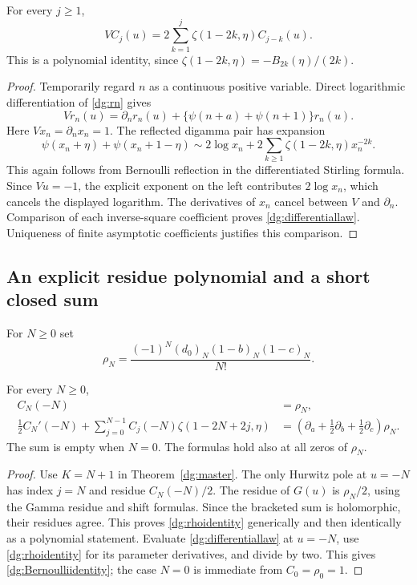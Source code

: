 \begin{lemma}\label{dg:differential}
For every $j\ge1$,
\begin{equation}\label{dg:differentiallaw}
 \boxed{VC_j(u)=2\sum_{k=1}^j
                      \zeta(1-2k,\eta)C_{j-k}(u).}
\end{equation}
This is a polynomial identity, since
$\zeta(1-2k,\eta)=-B_{2k}(\eta)/(2k)$.
\end{lemma}
\begin{proof}
Temporarily regard $n$ as a continuous positive variable. Direct
logarithmic differentiation of \eqref{dg:rn} gives
\begin{equation}\label{dg:termtransport}
 Vr_n(u)=\partial_n r_n(u)
                 +\{\psi(n+a)+\psi(n+1)\}r_n(u).
\end{equation}
Here $Vx_n=\partial_nx_n=1$. The reflected digamma pair has expansion
\[
 \psi(x_n+\eta)+\psi(x_n+1-\eta)
 \sim2\log x_n+2\sum_{k\ge1}\zeta(1-2k,\eta)x_n^{-2k}.
\]
This again follows from Bernoulli reflection in the differentiated
Stirling formula. Since $Vu=-1$, the explicit exponent on the left
contributes $2\log x_n$, which cancels the displayed logarithm.
The derivatives of $x_n$ cancel between $V$ and $\partial_n$.
Comparison of each inverse-square coefficient proves
\eqref{dg:differentiallaw}. Uniqueness of finite asymptotic
coefficients justifies this comparison.
\end{proof}

\subsection{An explicit residue polynomial and a short closed sum}
For $N\ge0$ set
\begin{equation}\label{dg:rho}
 \rho_N=\frac{(-1)^N(d_0)_N(1-b)_N(1-c)_N}{N!}.
\end{equation}

\begin{proposition}\label{dg:residues}
For every $N\ge0$,
\begin{align}
 C_N(-N)&=\rho_N,\label{dg:rhoidentity}\\
 \frac12C_N'(-N)+
 \sum_{j=0}^{N-1}C_j(-N)\zeta(1-2N+2j,\eta)
 &=\left(\partial_a+\tfrac12\partial_b+\tfrac12\partial_c\right)\rho_N.
 \label{dg:Bernoulliidentity}
\end{align}
The sum is empty when $N=0$. The formulas hold also at all zeros of
$\rho_N$.
\end{proposition}
\begin{proof}
Use $K=N+1$ in Theorem~\ref{dg:master}. The only Hurwitz pole at
$u=-N$ has index $j=N$ and residue $C_N(-N)/2$. The residue of
$G(u)$ is $\rho_N/2$, using the Gamma residue and shift formulas.
Since the bracketed sum is holomorphic, their residues agree. This
proves \eqref{dg:rhoidentity} generically and then identically as a
polynomial statement. Evaluate \eqref{dg:differentiallaw} at $u=-N$,
use \eqref{dg:rhoidentity} for its parameter derivatives, and divide
by two. This gives \eqref{dg:Bernoulliidentity}; the case $N=0$ is
immediate from $C_0=\rho_0=1$.
\end{proof}

